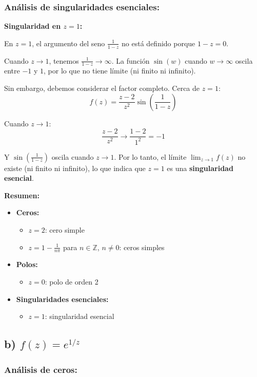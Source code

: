 \documentclass{article}
\begin{document}
\subsubsection*{Análisis de singularidades esenciales:}

\textbf{Singularidad en $z = 1$:}

En $z = 1$, el argumento del seno $\frac{1}{1 - z}$ no está definido porque $1 - z = 0$.

Cuando $z \to 1$, tenemos $\frac{1}{1 - z} \to \infty$. La función $\sin(w)$ cuando $w \to \infty$ oscila entre $-1$ y $1$, por lo que no tiene límite (ni finito ni infinito).

Sin embargo, debemos considerar el factor completo. Cerca de $z = 1$:
$$f(z) = \frac{z - 2}{z^2} \sin\left(\frac{1}{1 - z}\right)$$

Cuando $z \to 1$:
$$\frac{z - 2}{z^2} \to \frac{1 - 2}{1^2} = -1$$

Y $\sin\left(\frac{1}{1 - z}\right)$ oscila cuando $z \to 1$. Por lo tanto, el límite $\lim_{z \to 1} f(z)$ no existe (ni finito ni infinito), lo que indica que $z = 1$ es una \textbf{singularidad esencial}.

\textbf{Resumen:}
\begin{itemize}
\item \textbf{Ceros:}
  \begin{itemize}
  \item $z = 2$: cero simple
  \item $z = 1 - \frac{1}{n\pi}$ para $n \in \mathbb{Z}$, $n \neq 0$: ceros simples
  \end{itemize}
\item \textbf{Polos:}
  \begin{itemize}
  \item $z = 0$: polo de orden 2
  \end{itemize}
\item \textbf{Singularidades esenciales:}
  \begin{itemize}
  \item $z = 1$: singularidad esencial
  \end{itemize}
\end{itemize}

\subsection*{b) $f(z) = e^{1/z}$}

\subsubsection*{Análisis de ceros:}
\end{document}
